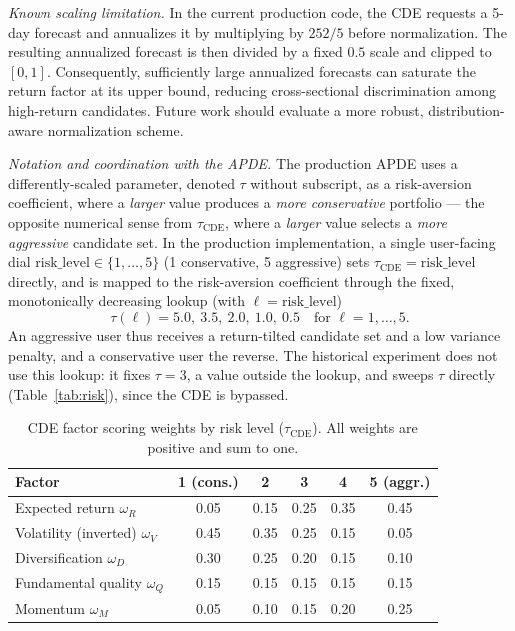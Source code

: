 \documentclass[conference]{IEEEtran}
\begin{document}
\emph{Known scaling limitation.} In the current production code, the
CDE requests a 5-day forecast and annualizes it by multiplying by
$252/5$ before normalization. The resulting annualized forecast is
then divided by a fixed $0.5$ scale and clipped to $[0,1]$. Consequently,
sufficiently large annualized forecasts can saturate the return factor
at its upper bound, reducing cross-sectional discrimination among
high-return candidates. Future work should evaluate a more robust,
distribution-aware normalization scheme.

\emph{Notation and coordination with the APDE.} The production APDE
uses a differently-scaled parameter, denoted $\tau$ without subscript,
as a risk-aversion coefficient, where a \emph{larger} value produces a
\emph{more conservative} portfolio --- the opposite numerical sense
from $\tau_{\text{CDE}}$, where a \emph{larger} value selects a
\emph{more aggressive} candidate set. In the production implementation,
a single user-facing dial $\mathrm{risk\_level} \in \{1,\dots,5\}$
(1 conservative, 5 aggressive) sets $\tau_{\text{CDE}} =
\mathrm{risk\_level}$ directly, and is mapped to the risk-aversion
coefficient through the fixed, monotonically decreasing lookup
(with $\ell=\mathrm{risk\_level}$)
\begin{equation}
\tau(\ell) = 5.0,\ 3.5,\ 2.0,\ 1.0,\ 0.5
\quad\text{for } \ell = 1,\dots,5.
\label{eq:risklambda}
\end{equation}
An aggressive user thus receives a return-tilted candidate set and a
low variance penalty, and a conservative user the reverse. The
historical experiment does not use this lookup: it fixes $\tau=3$, a
value outside the lookup, and sweeps $\tau$ directly
(Table~\ref{tab:risk}), since the CDE is bypassed.

\begin{table}[t]
\caption{CDE factor scoring weights by risk level
($\tau_{\text{CDE}}$). All weights are positive and sum to one.}
\label{tab:omega}
\centering
\footnotesize
\setlength{\tabcolsep}{4pt}
\renewcommand{\arraystretch}{1.15}
\begin{tabular}{@{}lccccc@{}}
\toprule
\textbf{Factor} & \textbf{1} (cons.) & \textbf{2} & \textbf{3} & \textbf{4} & \textbf{5} (aggr.) \\
\midrule
Expected return $\omega_R$ & 0.05 & 0.15 & 0.25 & 0.35 & 0.45 \\
Volatility (inverted) $\omega_V$ & 0.45 & 0.35 & 0.25 & 0.15 & 0.05 \\
Diversification $\omega_D$ & 0.30 & 0.25 & 0.20 & 0.15 & 0.10 \\
Fundamental quality $\omega_Q$ & 0.15 & 0.15 & 0.15 & 0.15 & 0.15 \\
Momentum $\omega_M$ & 0.05 & 0.10 & 0.15 & 0.20 & 0.25 \\
\bottomrule
\end{tabular}
\end{table}
\end{document}
